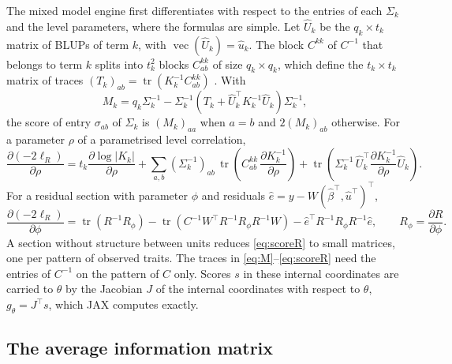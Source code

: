 \documentclass[article,nojss]{jss}
\renewcommand{\pkg}[1]{#1}
\newcommand{\tr}{\operatorname{tr}}
\newcommand{\vecop}{\operatorname{vec}}
\begin{document}
The mixed model engine first differentiates with respect to the entries of
each $\Sigma_k$ and the level parameters, where the formulas are simple. Let
$\hat U_k$ be the $q_k \times t_k$ matrix of BLUPs of term $k$, with
$\vecop(\hat U_k) = \hat u_k$. The block $C^{kk}$ of $C^{-1}$ that belongs to
term $k$ splits into $t_k^2$ blocks $C^{kk}_{ab}$ of size $q_k \times q_k$,
which define the $t_k \times t_k$ matrix of traces $(T_k)_{ab} =
\tr(K_k^{-1} C^{kk}_{ab})$ \citep{jensen1997,melsen2026}. With
\begin{equation}\label{eq:M}
  M_k = q_k \Sigma_k^{-1} - \Sigma_k^{-1}\left(T_k + \hat U_k^\top K_k^{-1}
  \hat U_k\right)\Sigma_k^{-1},
\end{equation}
the score of entry $\sigma_{ab}$ of $\Sigma_k$ is $(M_k)_{aa}$ when $a = b$
and $2(M_k)_{ab}$ otherwise. For a parameter $\rho$ of a parametrised level
correlation,
\begin{equation}\label{eq:scorerho}
  \frac{\partial(-2\ell_R)}{\partial\rho}
  = t_k \frac{\partial\log|K_k|}{\partial\rho}
  + \sum_{a,b} (\Sigma_k^{-1})_{ab}\,
    \tr\!\left(C^{kk}_{ab}\,\frac{\partial K_k^{-1}}{\partial\rho}\right)
  + \tr\!\left(\Sigma_k^{-1}\, \hat U_k^\top \frac{\partial
    K_k^{-1}}{\partial\rho} \hat U_k\right).
\end{equation}
For a residual section with parameter $\phi$ and residuals $\hat e = y -
W(\hat\beta^\top, \hat u^\top)^\top$,
\begin{equation}\label{eq:scoreR}
  \frac{\partial(-2\ell_R)}{\partial\phi}
  = \tr(R^{-1}R_\phi)
  - \tr\!\left(C^{-1} W^\top R^{-1} R_\phi R^{-1} W\right)
  - \hat e^\top R^{-1} R_\phi R^{-1} \hat e,
  \qquad R_\phi = \frac{\partial R}{\partial \phi}.
\end{equation}
A section without structure between units reduces \eqref{eq:scoreR} to small
matrices, one per pattern of observed traits. The traces in
\eqref{eq:M}--\eqref{eq:scoreR} need the entries of $C^{-1}$ on the pattern of
$C$ only. Scores $s$ in these internal coordinates are carried to $\theta$
by the Jacobian $J$ of the internal coordinates with respect to $\theta$,
$g_\theta = J^\top s$, which \pkg{JAX} computes exactly.

\subsection{The average information matrix}
\end{document}
